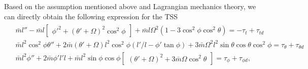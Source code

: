 \documentclass[3p]{elsarticle}
\theoremstyle{plain}
\theoremstyle{remark}
\begin{document}
Based on the assumption mentioned above and Lagrangian mechanics theory, we can directly obtain the following expression for the TSS~\cite{Sun2014304,Mantellato2015}
\begin{align}
\begin{split}
&\bar m l''-\bar m l\begin{bmatrix}\phi'^2+(\theta'+\Omega)^2\cos^2\phi\end{bmatrix}+\bar m l\Omega^2(1-3\cos^2\phi\cos^2\theta)=-\tau_t+\tau_{td}\\
&\bar m l^2\cos^2\phi\theta''+2\bar m (\theta'+\Omega)l^2\cos^2\phi(l'/l-\phi'\tan\phi)+3\bar m \Omega^2l^2\sin\theta\cos\theta\cos^2\phi=\tau_\theta+\tau_{\theta d}\\
&\bar m l^2\phi''+2\bar m \phi'l'l+\bar m l^2\sin\phi\cos\phi\begin{bmatrix}(\theta'+\Omega)^2+3\bar m \Omega\cos^2\theta\end{bmatrix}=\tau_\phi+\tau_{\phi d},\label{eq:dynamics 1}
\end{split}
\end{align}
\end{document}
